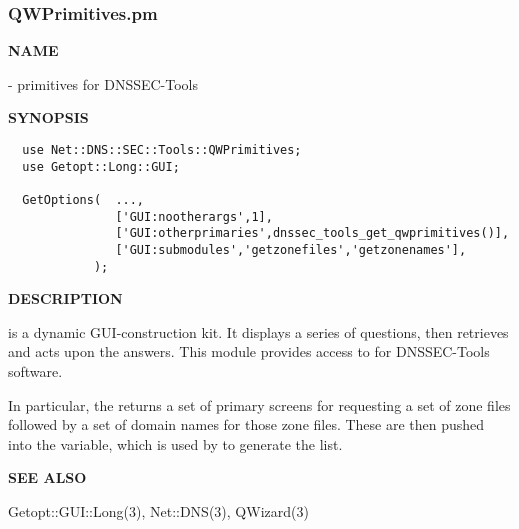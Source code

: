 \clearpage

\subsubsection{QWPrimitives.pm}

{\bf NAME}

 -  primitives for
DNSSEC-Tools

{\bf SYNOPSIS}

\begin{verbatim}
  use Net::DNS::SEC::Tools::QWPrimitives;
  use Getopt::Long::GUI;

  GetOptions(  ...,
               ['GUI:nootherargs',1],
               ['GUI:otherprimaries',dnssec_tools_get_qwprimitives()],
               ['GUI:submodules','getzonefiles','getzonenames'],
            );
\end{verbatim}

{\bf DESCRIPTION}

 is a dynamic GUI-construction kit.  It displays a series of
questions, then retrieves and acts upon the answers.  This module provides
access to  for DNSSEC-Tools software.

In particular, the  returns a set of
primary screens for requesting a set of zone files followed by a set of domain
names for those zone files.  These are then pushed into the
  variable, which is used by
 to generate the \var{\@ARGV} list.

{\bf SEE ALSO}

Getopt::GUI::Long(3),
Net::DNS(3),
QWizard(3)

